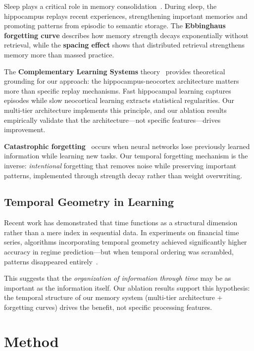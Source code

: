 \documentclass[11pt]{article}
\begin{document}
Sleep plays a critical role in memory consolidation~\citep{walker2009sleep}. During sleep, the hippocampus replays recent experiences, strengthening important memories and promoting patterns from episodic to semantic storage. The \textbf{Ebbinghaus forgetting curve} describes how memory strength decays exponentially without retrieval, while the \textbf{spacing effect} shows that distributed retrieval strengthens memory more than massed practice.

The \textbf{Complementary Learning Systems} theory~\citep{mcclelland1995complementary} provides theoretical grounding for our approach: the hippocampus-neocortex architecture matters more than specific replay mechanisms. Fast hippocampal learning captures episodes while slow neocortical learning extracts statistical regularities. Our multi-tier architecture implements this principle, and our ablation results empirically validate that the architecture---not specific features---drives improvement.

\textbf{Catastrophic forgetting}~\citep{french1999catastrophic,kirkpatrick2017catastrophic} occurs when neural networks lose previously learned information while learning new tasks. Our temporal forgetting mechanism is the inverse: \textit{intentional} forgetting that removes noise while preserving important patterns, implemented through strength decay rather than weight overwriting.

\subsection{Temporal Geometry in Learning}

Recent work has demonstrated that time functions as a structural dimension rather than a mere index in sequential data. In experiments on financial time series, algorithms incorporating temporal geometry achieved significantly higher accuracy in regime prediction---but when temporal ordering was scrambled, patterns disappeared entirely~\citep{temporal_geometry}.

This suggests that the \textit{organization of information through time} may be as important as the information itself. Our ablation results support this hypothesis: the temporal structure of our memory system (multi-tier architecture + forgetting curves) drives the benefit, not specific processing features.

\section{Method}
\end{document}
